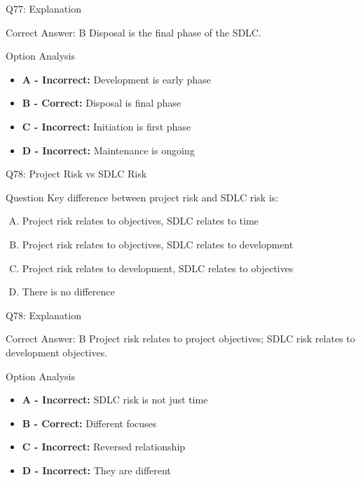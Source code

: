 \documentclass{beamer}
\begin{document}
	\begin{frame}{Q77: Explanation}
		\begin{block}{Correct Answer: B}
			Disposal is the final phase of the SDLC.
		\end{block}
		\begin{block}{Option Analysis}
			\begin{itemize}
				\item \textbf{A - Incorrect:} Development is early phase
				\item \textbf{B - Correct:} Disposal is final phase
				\item \textbf{C - Incorrect:} Initiation is first phase
				\item \textbf{D - Incorrect:} Maintenance is ongoing
			\end{itemize}
		\end{block}
	\end{frame}
	
	\begin{frame}{Q78: Project Risk vs SDLC Risk}
		\begin{block}{Question}
			Key difference between project risk and SDLC risk is:
		\end{block}
		\begin{enumerate}[(A)]
			\item Project risk relates to objectives, SDLC relates to time
			\item Project risk relates to objectives, SDLC relates to development
			\item Project risk relates to development, SDLC relates to objectives
			\item There is no difference
		\end{enumerate}
	\end{frame}
	
	\begin{frame}{Q78: Explanation}
		\begin{block}{Correct Answer: B}
			Project risk relates to project objectives; SDLC risk relates to development objectives.
		\end{block}
		\begin{block}{Option Analysis}
			\begin{itemize}
				\item \textbf{A - Incorrect:} SDLC risk is not just time
				\item \textbf{B - Correct:} Different focuses
				\item \textbf{C - Incorrect:} Reversed relationship
				\item \textbf{D - Incorrect:} They are different
			\end{itemize}
		\end{block}
	\end{frame}
	
\end{document}
